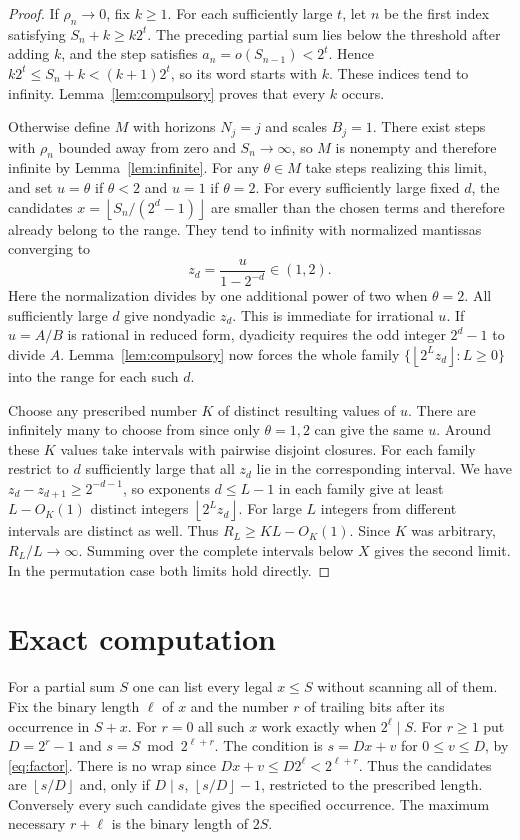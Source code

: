 \documentclass[11pt]{article}
\newcommand{\fl}[1]{\left\lfloor#1\right\rfloor}
\begin{document}
\begin{proof}
If $\rho_n\to0$, fix $k\ge1$. For each sufficiently large $t$, let $n$ be the first index satisfying $S_n+k\ge k2^t$. The preceding partial sum lies below the threshold after adding $k$, and the step satisfies $a_n=o(S_{n-1})<2^t$. Hence $k2^t\le S_n+k<(k+1)2^t$, so its word starts with $k$. These indices tend to infinity. Lemma~\ref{lem:compulsory} proves that every $k$ occurs.

Otherwise define $M$ with horizons $N_j=j$ and scales $B_j=1$. There exist steps with $\rho_n$ bounded away from zero and $S_n\to\infty$, so $M$ is nonempty and therefore infinite by Lemma~\ref{lem:infinite}. For any $\theta\in M$ take steps realizing this limit, and set $u=\theta$ if $\theta<2$ and $u=1$ if $\theta=2$. For every sufficiently large fixed $d$, the candidates $x=\fl{S_n/(2^d-1)}$ are smaller than the chosen terms and therefore already belong to the range. They tend to infinity with normalized mantissas converging to
\[
 z_d=\frac{u}{1-2^{-d}}\in(1,2).
\]
Here the normalization divides by one additional power of two when $\theta=2$. All sufficiently large $d$ give nondyadic $z_d$. This is immediate for irrational $u$. If $u=A/B$ is rational in reduced form, dyadicity requires the odd integer $2^d-1$ to divide $A$. Lemma~\ref{lem:compulsory} now forces the whole family $\{\fl{2^L z_d}:L\ge0\}$ into the range for each such $d$.

Choose any prescribed number $K$ of distinct resulting values of $u$. There are infinitely many to choose from since only $\theta=1,2$ can give the same $u$. Around these $K$ values take intervals with pairwise disjoint closures. For each family restrict to $d$ sufficiently large that all $z_d$ lie in the corresponding interval. We have $z_d-z_{d+1}\ge2^{-d-1}$, so exponents $d\le L-1$ in each family give at least $L-O_K(1)$ distinct integers $\fl{2^L z_d}$. For large $L$ integers from different intervals are distinct as well. Thus $R_L\ge K L-O_K(1)$. Since $K$ was arbitrary, $R_L/L\to\infty$. Summing over the complete intervals below $X$ gives the second limit. In the permutation case both limits hold directly.
\end{proof}

\section{Exact computation}
For a partial sum $S$ one can list every legal $x\le S$ without scanning all of them. Fix the binary length $\ell$ of $x$ and the number $r$ of trailing bits after its occurrence in $S+x$. For $r=0$ all such $x$ work exactly when $2^\ell\mid S$. For $r\ge1$ put $D=2^r-1$ and $s=S\bmod 2^{\ell+r}$. The condition is $s=Dx+v$ for $0\le v\le D$, by \eqref{eq:factor}. There is no wrap since $Dx+v\le D2^\ell<2^{\ell+r}$. Thus the candidates are $\fl{s/D}$ and, only if $D\mid s$, $\fl{s/D}-1$, restricted to the prescribed length. Conversely every such candidate gives the specified occurrence. The maximum necessary $r+\ell$ is the binary length of $2S$.
\end{document}
